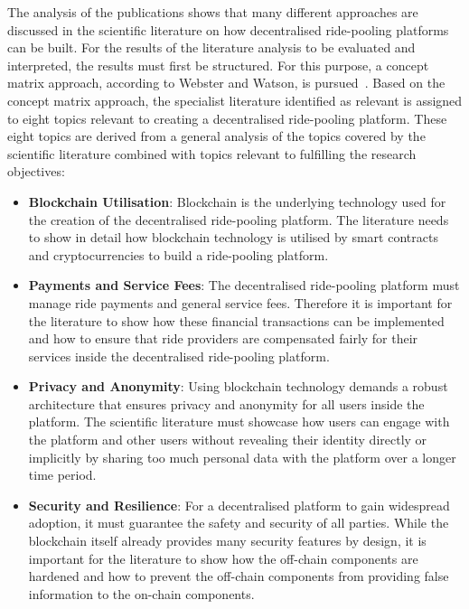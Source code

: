 The analysis of the publications shows that many different approaches are discussed in the scientific literature on how decentralised ride-pooling platforms can be built. For the results of the literature analysis to be evaluated and interpreted, the results must first be structured. For this purpose, a concept matrix approach, according to Webster and Watson, is pursued~\cite{Webster.2002}. Based on the concept matrix approach, the specialist literature identified as relevant is assigned to eight topics relevant to creating a decentralised ride-pooling platform. These eight topics are derived from a general analysis of the topics covered by the scientific literature combined with topics relevant to fulfilling the research objectives:

\begin{itemize}
    \item \textbf{Blockchain Utilisation}: Blockchain is the underlying technology used for the creation of the decentralised ride-pooling platform. The literature needs to show in detail how blockchain technology is utilised by smart contracts and cryptocurrencies to build a ride-pooling platform.
    
    \item \textbf{Payments and Service Fees}: The decentralised ride-pooling platform must manage ride payments and general service fees. Therefore it is important for the literature to show how these financial transactions can be implemented and how to ensure that ride providers are compensated fairly for their services inside the decentralised ride-pooling platform.
    
    \item \textbf{Privacy and Anonymity}: Using blockchain technology demands a robust architecture that ensures privacy and anonymity for all users inside the platform. The scientific literature must showcase how users can engage with the platform and other users without revealing their identity directly or implicitly by sharing too much personal data with the platform over a longer time period.
    
    \item \textbf{Security and Resilience}: For a decentralised platform to gain widespread adoption, it must guarantee the safety and security of all parties. While the blockchain itself already provides many security features by design, it is important for the literature to show how the off-chain components are hardened and how to prevent the off-chain components from providing false information to the on-chain components.
    

\end{itemize}
